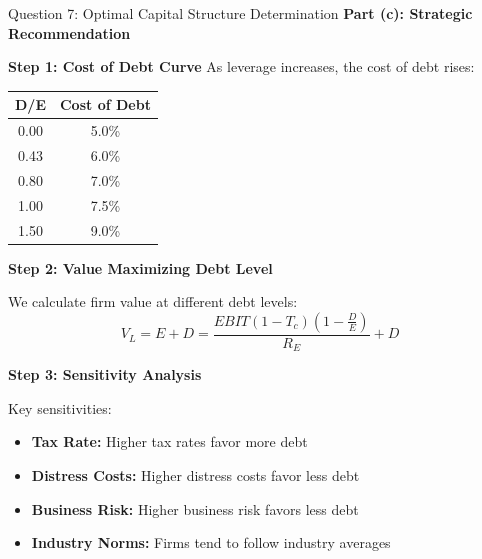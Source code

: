 \documentclass[aspectratio=169]{beamer}
\newcommand{\question}[1]{{\large\bfseries\color{crimson}#1}}
\begin{document}
	
	\begin{frame}{Question 7: Optimal Capital Structure Determination}
		\question{Part (c): Strategic Recommendation}
		
		\textbf{Step 1: Cost of Debt Curve}
		As leverage increases, the cost of debt rises:
		
		\begin{table}[h]
			\centering
			\begin{tabular}{|c|c|}
				\hline
				\textbf{D/E} & \textbf{Cost of Debt} \\
				\hline
				0.00 & 5.0\% \\
				0.43 & 6.0\% \\
				0.80 & 7.0\% \\
				1.00 & 7.5\% \\
				1.50 & 9.0\% \\
				\hline
			\end{tabular}
		\end{table}
		
		\textbf{Step 2: Value Maximizing Debt Level}
		
		We calculate firm value at different debt levels:
		\[
		V_L = E + D = \frac{EBIT(1 - T_c)(1 - \frac{D}{E})}{R_E} + D
		\]
		
		\textbf{Step 3: Sensitivity Analysis}
		
		Key sensitivities:
		\begin{itemize}
			\item \textbf{Tax Rate:} Higher tax rates favor more debt
			\item \textbf{Distress Costs:} Higher distress costs favor less debt
			\item \textbf{Business Risk:} Higher business risk favors less debt
			\item \textbf{Industry Norms:} Firms tend to follow industry averages
		\end{itemize}
	\end{frame}
	

	
	
\end{document}
